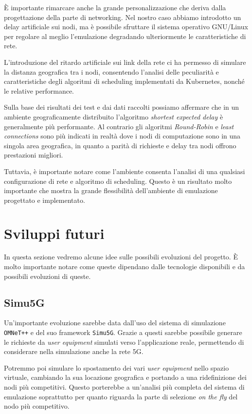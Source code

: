 \documentclass[12pt, hidelinks]{report}
\begin{document}
È importante rimarcare anche la grande personalizzazione che deriva dalla progettazione della parte di networking. Nel nostro caso abbiamo introdotto un delay artificiale sui nodi, ma è possibile sfruttare il sistema operativo GNU/Linux per regolare al meglio l'emulazione degradando ulteriormente le caratteristiche di rete. 

L'introduzione del ritardo artificiale sui link della rete ci ha permesso di simulare la distanza geografica tra i nodi, consentendo l'analisi delle peculiarità e caratteristiche degli algoritmi di scheduling implementati da Kubernetes, nonché le relative performance. 

Sulla base dei risultati dei test e dai dati raccolti possiamo affermare che in un ambiente geograficamente distribuito l'algoritmo \textit{shortest expected delay} è generalmente più performante. Al contrario gli algoritmi \textit{Round-Robin} e \textit{least connections} sono più indicati in realtà dove i nodi di computazione sono in una singola area geografica, in quanto a parità di richieste e delay tra nodi offrono prestazioni migliori.

Tuttavia, è importante notare come l'ambiente consenta l'analisi di una qualsiasi configurazione di rete e algoritmo di scheduling. Questo è un risultato molto importante che mostra la grande flessibilità dell'ambiente di emulazione progettato e implementato.

\section*{Sviluppi futuri}

In questa sezione vedremo alcune idee sulle possibili evoluzioni del progetto. È molto importante notare come queste dipendano dalle tecnologie disponibili e da possibili evoluzioni di queste.

\subsection*{Simu5G}

Un'importante evoluzione sarebbe data dall'uso del sistema di simulazione \texttt{OMNeT++} e del suo framework \texttt{Simu5G}. Grazie a questi sarebbe possibile generare le richieste da \textit{user equipment} simulati verso l'applicazione reale, permettendo di considerare nella simulazione anche la rete 5G. 

Potremmo poi simulare lo spostamento dei vari \textit{user equipment} nello spazio virtuale, cambiando la sua locazione geografica e portando a una ridefinizione dei nodi più competitivi. Questo porterebbe a un'analisi più completa del sistema di emulazione soprattutto per quanto riguarda la parte di selezione \textit{on the fly} del nodo più competitivo.
\end{document}
